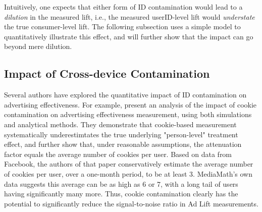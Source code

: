 \documentclass[11pt,a4paper]{article}
\theoremstyle{definition}
\theoremstyle{remark}
\theoremstyle{definition}
\theoremstyle{definition}
\theoremstyle{definition}
\theoremstyle{definition}
\theoremstyle{definition}
\theoremstyle{definition}
\begin{document}
Intuitively, one expects that either form of ID contamination would lead to a \textit{dilution} in the measured lift, i.e., the measured userID-level lift would \textit{understate} the true consumer-level lift. The following subsection uses a simple model to quantitatively illustrate this effect, and will further show that the impact can go beyond mere dilution.

\subsection{Impact of Cross-device Contamination}
Several authors have explored the quantitative impact of ID contamination on advertising effectiveness. For example, \cite{coey2016people} present an analysis of the impact of cookie contamination on advertising effectiveness measurement, using both simulations and analytical methods. They demonstrate that cookie-based measurement systematically underestimtates the true underlying "person-level" treatment effect, and further show that, under reasonable assumptions, the attenuation factor equals the average number of cookies per user. Based on data from Facebook, the authors of that paper conservatively estimate the average number of cookies per user, over a one-month period, to be at least 3. MediaMath's own data suggests this average can be as high as 6 or 7, with a long tail of users having significantly many more. Thus, cookie contamination clearly has the potential to significantly reduce the signal-to-noise ratio in Ad Lift measurements.
\end{document}
